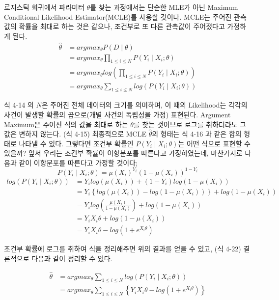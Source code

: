 \documentclass[a4paper]{oblivoir}
\begin{document}
\indent 로지스틱 회귀에서 파라미터 $\theta$를 찾는 과정에서는 단순한 MLE가 아닌 Maximum Conditional Likelihood Estimator(MCLE)를 사용할 것이다. MCLE는 주어진 관측값의 확률을 최대로 하는 것은 같으나, 조건부로 또 다른 관측값이 주어졌다고 가정하게 된다.
\begin{align*}
\hat{\theta} 	&=argmax_{\theta}P(D \mid \theta)												\tag{4-13}\\
			&=argmax_{\theta}\prod_{1\le i\le N}P(Y_{i} \mid X_{i};\theta)					\tag{4-14}\\
			&=argmax_{\theta}log\left(\prod_{1\le i\le N}P(Y_{i} \mid X_{i};\theta)\right)		\tag{4-15}\\
			&=argmax_{\theta}\sum_{1\le i\le N}log(P(Y_{i} \mid X_{i};\theta))				\tag{4-16}
\end{align*}

\indent 식 4-14 의 $N$은 주어진 전체 데이터의 크기를 의미하며, 이 때의 Likelihood는 각각의 사건이 발생할 확률의 곱으로(개별 사건의 독립성을 가정) 표현된다. Argument Maximum은 주어진 식의 값을 최대로 하는 $\theta$를 찾는 것이므로 로그를 취하더라도 그 값은 변하지 않는다. (식 4-15) 최종적으로 MCLE $\hat{\theta}$의 형태는 식 4-16 과 같은 합의 형태로 나타낼 수 있다. 그렇다면 조건부 확률인 $P(Y_{i} \mid X_{i};\theta)$는 어떤 식으로 표현할 수 있을까? 앞서 우리는 조건부 확률이 이항분포를 따른다고 가정하였는데, 마찬가지로 다음과 같이 이항분포를 따른다고 가정할 것이다;
\begin{equation*}P(Y_{i} \mid X_{i};\theta) = \mu(X_{i})^{Y_{i}}(1-\mu(X_{i}))^{1-Y_{i}}\tag{4-17} \end{equation*}
\begin{align*}
log(P(Y_{i} \mid X_{i};\theta))	&=Y_{i}log(\mu(X_{i}))+(1-Y_{i})log(1-\mu(X_{i}))	\tag{4-18}\\
	&=Y_{i}\left\{log(\mu(X_{i}))-log(1-\mu(X_{i}))\right\}+log(1-\mu(X_{i}))			\tag{4-19}\\
	&=Y_{i}log\left(\frac{\mu(X_{i})}{1-\mu(X_{i})}\right)+log(1-\mu(X_{i}))			\tag{4-20}\\
	&=Y_{i}X_{i}\theta+log(1-\mu(X_{i}))											\tag{4-21}\\
	&=Y_{i}X_{i}\theta-log(1+e^{X_{i}\theta})										\tag{4-22}
\end{align*}

\indent 조건부 확률에 로그를 취하여 식을 정리해주면 위의 결과를 얻을 수 있고, (식 4-22) 결론적으로 다음과 같이 정리할 수 있다.

\begin{align*}
\hat{\theta}	&=argmax_{\theta}\sum_{1\le i\le N}log(P(Y_{i} \mid X_{i};\theta)) \tag{4-23}\\
&=argmax_{\theta}\sum_{1\le i\le N}\left\{Y_{i}X_{i}\theta - log(1+e^{X_{i}\theta})\right\}	\tag{4-24}
\end{align*}
\end{document}
